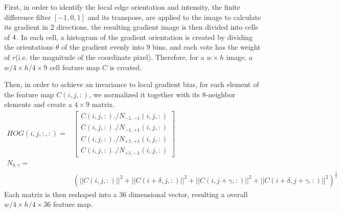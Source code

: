 \documentclass[12pt]{article}
\begin{document}
First, in order to identify the local edge orientation and intensity, the finite difference filter $[-1,0,1]$ and its transpose, are applied to the image to calculate its gradient in 2 directions, the resulting gradient image is then divided into cells of $4\time4$. In each cell, a histogram of the gradient orientation is created by dividing the orientations $\theta$ of the gradient evenly into 9 bins, and each vote has the weight of $r$(i.e. the magnitude of the coordinate pixel). Therefore, for a $ w\times h$ image,  a $w/4 \times h/4 \times 9$ cell feature map $C$ is created. 

Then, in order to achieve an invariance to local gradient bias, for each element of the feature map $C(i,j,:)$, we normalized it together with its 8-neighbor elements and create a $4\times 9$ matrix.
\begin{equation}
\begin{aligned}
HOG(i,j,:,:) =&  \left[\begin{array}{c}
C(i,j,:)./N_{-1,-1}(i,j,:)\\
C(i,j,:)./N_{-1,+1}(i,j,:)\\
C(i,j,:)./N_{+1,+1}(i,j,:)\\
C(i,j,:)./N_{+1,-1}(i,j,:)\end{array}\right]\\
 N_{\delta,\gamma} =&\\
 & (||C(i,j,:)||^2+||C(i+\delta,j,:)||^2+||C(i,j+\gamma,:)||^2+||C(i+\delta,j+\gamma,:)||^2)^{\frac{1}{2}}
\end{aligned}
\end{equation}\cite{felzenszwalb2010object}
Each matrix is then reshaped into a 36 dimensional vector, resulting a overall $ w/4 \times h/4 \times 36$ feature map.
\end{document}
